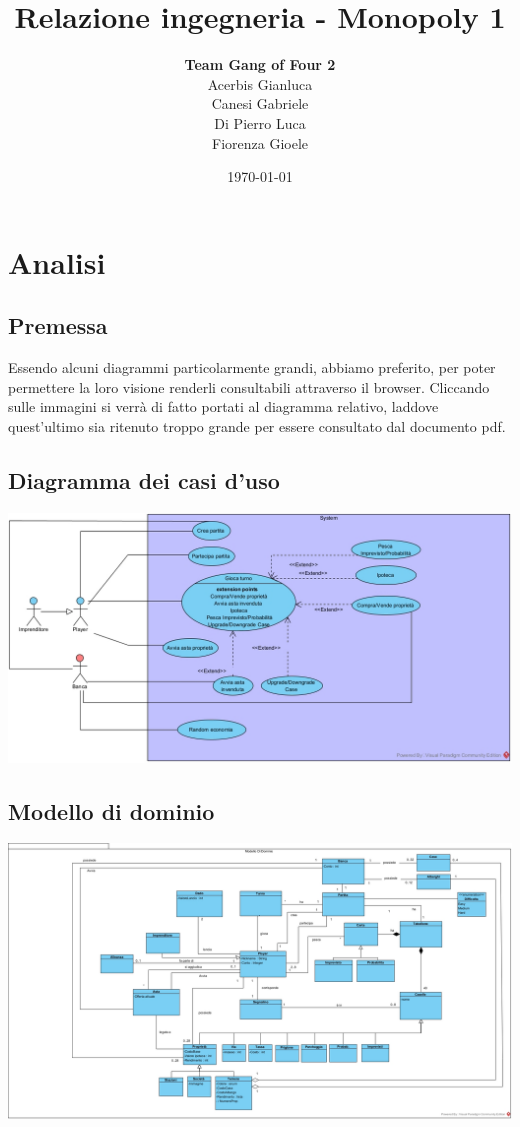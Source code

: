 \documentclass{article}
\title{Relazione ingegneria - Monopoly 1}
\author {\textbf{Team Gang of Four 2}\\Acerbis Gianluca\\Canesi Gabriele\\Di Pierro Luca\\Fiorenza Gioele}
\date{\today}
\begin{document}
\maketitle

\section{Analisi}

\subsection{Premessa}
Essendo alcuni diagrammi particolarmente grandi, abbiamo preferito, per poter permettere la loro visione  renderli consultabili attraverso il browser.
Cliccando sulle immagini si verrà di fatto portati al diagramma relativo, laddove quest'ultimo sia ritenuto troppo grande per essere consultato dal documento pdf.

\subsection{Diagramma dei casi d'uso}
\href{https://github.com/UnimibSoftEngCourse2022/progetto-monopoly-1-gangoffour2/blob/feat/doc/doc/img/ModelloCasiDUso.jpg?raw=true}
	{\includegraphics[width=\textwidth]{ModelloCasiDUso}}

\subsection{Modello di dominio}
\href{https://github.com/UnimibSoftEngCourse2022/progetto-monopoly-1-gangoffour2/blob/feat/doc/doc/img/ModelloDiDominio.jpg?raw=true}
	{\includegraphics[width=\textwidth]{ModelloDiDominio}}
\end{document}

